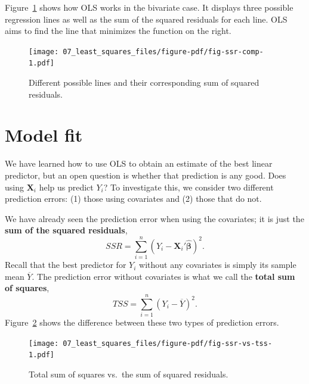 \documentclass[
  letterpaper,
  DIV=11,
  numbers=noendperiod]{scrreprt}
\newcommand{\mb}{\symbf}
\newcommand{\X}{\mb{X}}
\newcommand{\bhat}{\widehat{\mb{\beta}}}
\theoremstyle{plain}
\theoremstyle{definition}
\theoremstyle{definition}
\theoremstyle{remark}
\begin{document}
Figure~\ref{fig-ssr-comp} shows how OLS works in the bivariate case. It
displays three possible regression lines as well as the sum of the
squared residuals for each line. OLS aims to find the line that
minimizes the function on the right.

\begin{figure}[th]

{\centering \texttt{[image: 07\_least\_squares\_files/figure-pdf/fig-ssr-comp-1.pdf]}

}

\caption{\label{fig-ssr-comp}Different possible lines and their
corresponding sum of squared residuals.}

\end{figure}

\hypertarget{model-fit}{%
\section{Model fit}\label{model-fit}}

We have learned how to use OLS to obtain an estimate of the best linear
predictor, but an open question is whether that prediction is any good.
Does using \(\X_i\) help us predict \(Y_i\)? To investigate this, we
consider two different prediction errors: (1) those using covariates and
(2) those that do not.

We have already seen the prediction error when using the covariates; it
is just the \textbf{sum of the squared residuals}, \[ 
SSR = \sum_{i=1}^n (Y_i - \X_{i}'\bhat)^2.
\] Recall that the best predictor for \(Y_i\) without any covariates is
simply its sample mean \(\overline{Y}\). The prediction error without
covariates is what we call the \textbf{total sum of squares}, \[ 
TSS = \sum_{i=1}^n (Y_i - \overline{Y})^2.
\] Figure~\ref{fig-ssr-vs-tss} shows the difference between these two
types of prediction errors.

\begin{figure}[th]

{\centering \texttt{[image: 07\_least\_squares\_files/figure-pdf/fig-ssr-vs-tss-1.pdf]}

}

\caption{\label{fig-ssr-vs-tss}Total sum of squares vs.~the sum of
squared residuals.}

\end{figure}
\end{document}
